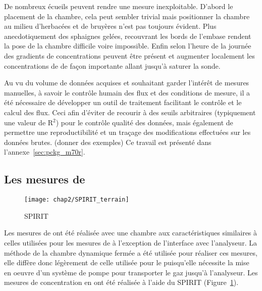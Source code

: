 De nombreux écueils peuvent rendre une mesure inexploitable. D'abord le placement de la chambre, cela peut sembler trivial mais positionner la chambre au milieu d'herbacées et de bruyères n'est pas toujours évident. 
Plus anecdotiquement des sphaignes gelées, recouvrant les bords de l'embase rendent la pose de la chambre difficile voire impossible. 
Enfin selon l'heure de la journée des gradients de concentrations peuvent être présent et augmenter localement les concentrations de \coo de façon importante allant jusqu'à saturer la sonde.

Au vu du volume de données acquises et souhaitant garder l'intérêt de mesures manuelles, à savoir le contrôle humain des flux et des conditions de mesure, il a été nécessaire de développer un outil de traitement facilitant le contrôle et le calcul des flux.
Ceci afin d'éviter de recourir à des seuils arbitraires (typiquement une valeur de R$^{2}$) pour le contrôle qualité des données, mais également de permettre une reproductibilité et un traçage des modifications effectuées sur les données brutes.
(donner des exemples)
Ce travail est présenté dans l'annexe~\ref{sec:pckg_m70r}.

\subsection{Les mesures de \texorpdfstring{\chh}{CH4}}

\begin{figure}
\texttt{[image: chap2/SPIRIT\_terrain]}
\caption{SPIRIT}
\label{fig:SPIRIT}
\end{figure}

Les mesures de \chh ont été réalisée avec une chambre aux caractéristiques similaires à celles utilisées pour les mesures de \coo à l'exception de l'interface avec l'analyseur.
La méthode de la chambre dynamique fermée a été utilisée pour réaliser ces mesures, elle diffère donc légèrement de celle utilisée pour le \coo puisqu'elle nécessite la mise en oeuvre d'un système de pompe pour transporter le gaz jusqu'à l'analyseur.
Les mesures de concentration en \chh ont été réalisée à l'aide du SPIRIT (Figure~\ref{fig:SPIRIT}).

